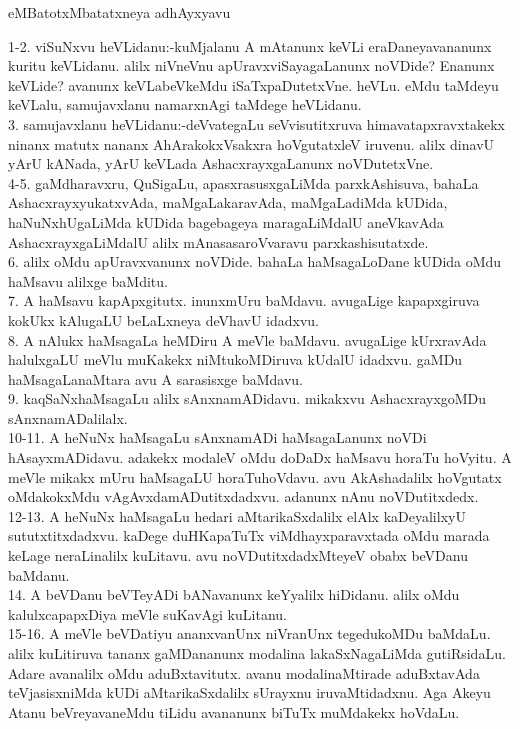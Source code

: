 \documentclass{article}
\begin{document}
\begin{center}
eMBatotxMbatatxneya adhAyxyavu
\end{center}

1-2. viSuNxvu heVLidanu:-kuMjalanu A mAtanunx keVLi eraDaneyavananunx kuritu keVLidanu. alilx niVneVnu apUravxviSayagaLanunx noVDide? Enanunx keVLide? avanunx keVLabeVkeMdu iSaTxpaDutetxVne. heVLu. eMdu taMdeyu keVLalu, samujavxlanu namarxnAgi taMdege heVLidanu.\\
3. samujavxlanu heVLidanu:-deVvategaLu seVvisutitxruva himavatapxravxtakekx ninanx matutx nananx AhArakokxVsakxra hoVgutatxleV iruvenu. alilx dinavU yArU kANada, yArU keVLada AshacxrayxgaLanunx noVDutetxVne.\\
4-5. gaMdharavxru, QuSigaLu, apasxrasusxgaLiMda parxkAshisuva, bahaLa AshacxrayxyukatxvAda, maMgaLakaravAda, maMgaLadiMda kUDida, haNuNxhUgaLiMda kUDida bagebageya maragaLiMdalU aneVkavAda AshacxrayxgaLiMdalU alilx mAnasasaroVvaravu parxkashisutatxde.\\
6. alilx oMdu apUravxvanunx noVDide. bahaLa haMsagaLoDane kUDida oMdu haMsavu alilxge baMditu.\\
7. A haMsavu kapApxgitutx. inunxmUru baMdavu. avugaLige kapapxgiruva kokUkx kAlugaLU beLaLxneya deVhavU idadxvu.\\
8. A nAlukx haMsagaLa heMDiru A meVle baMdavu. avugaLige kUrxravAda halulxgaLU meVlu muKakekx niMtukoMDiruva kUdalU idadxvu. gaMDu haMsagaLanaMtara avu A sarasisxge baMdavu.\\
9. kaqSaNxhaMsagaLu alilx sAnxnamADidavu. mikakxvu AshacxrayxgoMDu sAnxnamADalilalx.\\
10-11. A heNuNx haMsagaLu sAnxnamADi haMsagaLanunx noVDi hAsayxmADidavu. adakekx modaleV oMdu doDaDx haMsavu horaTu hoVyitu. A meVle mikakx mUru haMsagaLU horaTuhoVdavu. avu AkAshadalilx hoVgutatx oMdakokxMdu vAgAvxdamADutitxdadxvu. adanunx nAnu noVDutitxdedx.\\
12-13. A heNuNx haMsagaLu hedari aMtarikaSxdalilx elAlx kaDeyalilxyU sututxtitxdadxvu. kaDege duHKapaTuTx viMdhayxparavxtada oMdu marada keLage neraLinalilx kuLitavu. avu noVDutitxdadxMteyeV obabx beVDanu baMdanu.\\
14. A beVDanu beVTeyADi bANavanunx keYyalilx hiDidanu. alilx oMdu kalulxcapapxDiya meVle suKavAgi kuLitanu.\\
15-16. A meVle beVDatiyu ananxvanUnx niVranUnx tegedukoMDu baMdaLu. alilx kuLitiruva tananx gaMDananunx modalina lakaSxNagaLiMda gutiRsidaLu. Adare avanalilx oMdu aduBxtavitutx. avanu modalinaMtirade aduBxtavAda teVjasisxniMda kUDi aMtarikaSxdalilx sUrayxnu iruvaMtidadxnu. Aga Akeyu Atanu beVreyavaneMdu tiLidu avananunx biTuTx muMdakekx hoVdaLu.\\
\end{document}
